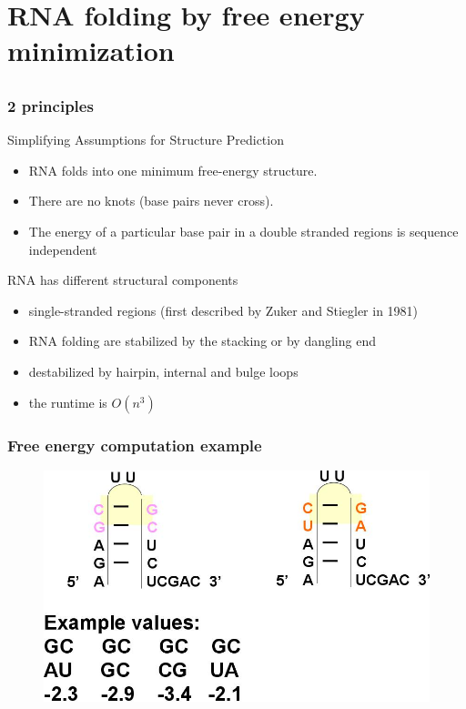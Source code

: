 \documentclass[ignorenonframetext,10pt]{beamer}
\begin{document}
\section{RNA folding by free energy minimization}
\subsection{}
\begin{frame}
\frametitle{2 principles}
  \begin{block}{Simplifying Assumptions for Structure Prediction}
    \begin{itemize}
    \item RNA folds into one minimum free-energy structure.
    \item There are no knots (base pairs never cross).
    \item The energy of a particular base pair in a double stranded regions is
    sequence independent
    \end{itemize} 
  \end{block}
  \begin{block}{RNA has different structural components}
    \begin{itemize}
    \item single-stranded regions (first described by Zuker and Stiegler in
    1981)
    \item RNA folding are stabilized by the stacking or by dangling end
    \item destabilized by hairpin, internal and bulge loops
    \item the runtime is $O(n^3)$
    \end{itemize}
  \end{block}
\end{frame}


\begin{frame}
\frametitle{Free energy computation example}  
\begin{figure}
  \includegraphics[scale=0.4]{images/nearest_neighbour_energy.jpg} 
\end{figure}
\end{frame}
\end{document}
